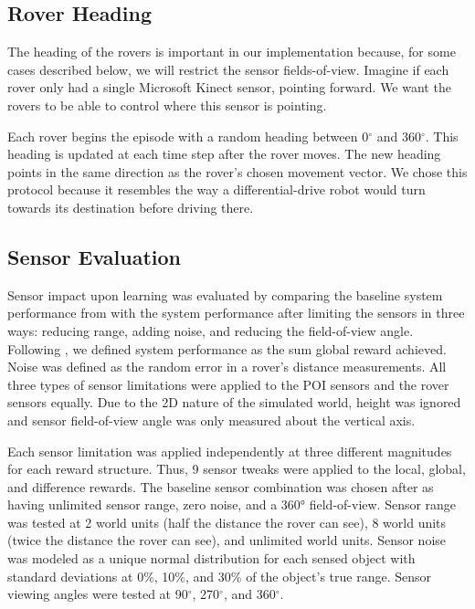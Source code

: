 \documentclass[letterpaper, 10 pt, conference]{ieeeconf}  %
\begin{document}
\subsection{Rover Heading}
The heading of the rovers is important in our implementation because, for some cases described below, we will restrict the sensor fields-of-view. Imagine if each rover only had a single Microsoft Kinect sensor, pointing forward. We want the rovers to be able to control where this sensor is pointing. 

Each rover begins the episode with a random heading between 0$^{\circ}$ and 360$^{\circ}$. This heading is updated at each time step after the rover moves. The new heading points in the same direction as the rover's chosen movement vector. We chose this protocol because it resembles the way a differential-drive robot would turn towards its destination before driving there. 

\subsection{Sensor Evaluation}
Sensor impact upon learning was evaluated by comparing the baseline
system performance from \cite{agogino2008analyzing} with the system performance after limiting
the sensors in three ways: reducing range, adding noise, and reducing
the field-of-view angle.  Following \cite{agogino2008analyzing}, we defined system performance
as the sum global reward achieved.  Noise was defined as the random
error in a rover’s distance measurements. All three types of sensor
limitations were applied to the POI sensors and the rover sensors
equally. Due to the 2D nature of the simulated world, height was
ignored and sensor field-of-view angle was only measured about the
vertical axis.

Each sensor limitation was applied independently at three different
magnitudes for each reward structure.  Thus, 9 sensor tweaks were applied to
the local, global, and difference rewards. The baseline sensor combination was chosen after \cite{agogino2008analyzing} as having
unlimited sensor range, zero noise, and a 360° field-of-view. Sensor
range was tested at 2 world units (half the distance the rover can see), 8 world units (twice the distance 
the rover can see), and unlimited world
units. Sensor noise was modeled as a unique normal distribution for
each sensed object with standard deviations at 0\%, 10\%, and 30\% of the
object’s true range. Sensor viewing angles were tested at 90$^{\circ}$, 270$^{\circ}$,
and 360$^{\circ}$.
\end{document}
